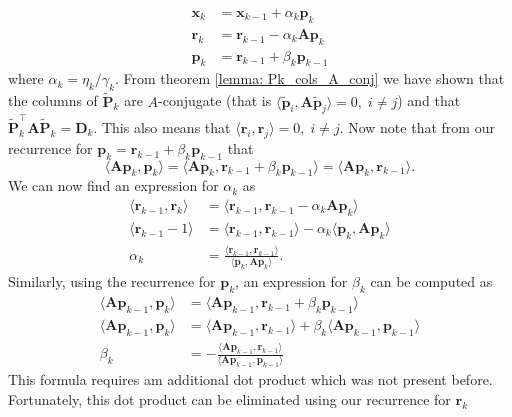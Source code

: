 \begin{align*}
    \bm{x}_k & = \bm{x}_{k-1} + \alpha_k \bm{p}_k        \\
    \bm{r}_k & = \bm{r}_{k-1} - \alpha_k \bm{A} \bm{p}_k \\
    \bm{p}_k & = \bm{r}_{k-1} + \beta_k \bm{p}_{k-1}
\end{align*}
where $\alpha_k = \eta_k / \gamma_k$. From theorem \ref{lemma: Pk_cols_A_conj} we have shown that the columns of $\tilde{\bm{P}}_k$ are $A$-conjugate (that is $\langle \tilde{\bm{p}}_i , \bm{A} \tilde{\bm{p}}_j \rangle = 0, \; i \neq j$) and that $\tilde{\bm{P}}_k^{\intercal} \bm{A} \tilde{\bm{P}}_k = \bm{D}_k$. This also means that $\langle \bm{r}_i , \bm{r}_j \rangle = 0, \; i \neq j$. Now note that from our recurrence for $\bm{p}_k = \bm{r}_{k-1} + \beta_k \bm{p}_{k-1}$ that
\[
    \langle \bm{A} \bm{p}_k ,\bm{p}_k \rangle = \langle \bm{A} \bm{p}_k , \bm{r}_{k-1} + \beta_k \bm{p}_{k-1} \rangle = \langle \bm{A} \bm{p}_k , \bm{r}_{k-1} \rangle.
\]
We can now find an expression for $\alpha_k$ as
\begin{align*}
    \langle \bm{r}_{k-1} , \bm{r}_{k} \rangle & = \langle \bm{r}_{k-1} , \bm{r}_{k-1} - \alpha_k \bm{A} \bm{p}_k \rangle                           \\
    \langle \bm{r}_{k-1} -1 \rangle           & = \langle \bm{r}_{k-1} , \bm{r}_{k-1} \rangle - \alpha_k \langle \bm{p}_k, \bm{A} \bm{p}_k \rangle \\
    \alpha_k                                  & = \frac{\langle \bm{r}_{k-1} , \bm{r}_{k-1} \rangle}{\langle \bm{p}_k, \bm{A} \bm{p}_k \rangle}.
\end{align*}
Similarly, using the recurrence for $\bm{p}_k$, an expression for $\beta_k$ can be computed as
\begin{align*}
    \langle \bm{A} \bm{p}_{k-1} , \bm{p}_k \rangle & = \langle \bm{A} \bm{p}_{k-1}, \bm{r}_{k-1} + \beta_k \bm{p}_{k-1} \rangle                                      \\
    \langle \bm{A} \bm{p}_{k-1} , \bm{p}_k \rangle & = \langle \bm{A} \bm{p}_{k-1}, \bm{r}_{k-1} \rangle + \beta_k \langle \bm{A} \bm{p}_{k-1}, \bm{p}_{k-1} \rangle \\
    \beta_k                                        & = - \frac{\langle \bm{A} \bm{p}_{k-1}, \bm{r}_{k-1} \rangle}{\langle \bm{A} \bm{p}_{k-1}, \bm{p}_{k-1} \rangle}
\end{align*}
This formula requires am additional dot product which was not present before. Fortunately, this dot product can be eliminated using our recurrence for $\bm{r}_k$
